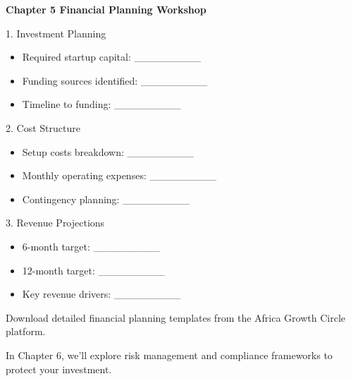 \begin{workshopbox}
\textbf{Chapter 5 Financial Planning Workshop}

1. Investment Planning
\begin{itemize}
    \item Required startup capital: \_\_\_\_\_\_\_\_\_
    \item Funding sources identified: \_\_\_\_\_\_\_\_\_
    \item Timeline to funding: \_\_\_\_\_\_\_\_\_
\end{itemize}

2. Cost Structure
\begin{itemize}
    \item Setup costs breakdown: \_\_\_\_\_\_\_\_\_
    \item Monthly operating expenses: \_\_\_\_\_\_\_\_\_
    \item Contingency planning: \_\_\_\_\_\_\_\_\_
\end{itemize}

3. Revenue Projections
\begin{itemize}
    \item 6-month target: \_\_\_\_\_\_\_\_\_
    \item 12-month target: \_\_\_\_\_\_\_\_\_
    \item Key revenue drivers: \_\_\_\_\_\_\_\_\_
\end{itemize}

Download detailed financial planning templates from the Africa Growth Circle platform.
\end{workshopbox}

\begin{importantbox}
In Chapter 6, we'll explore risk management and compliance frameworks to protect your investment.
\end{importantbox}